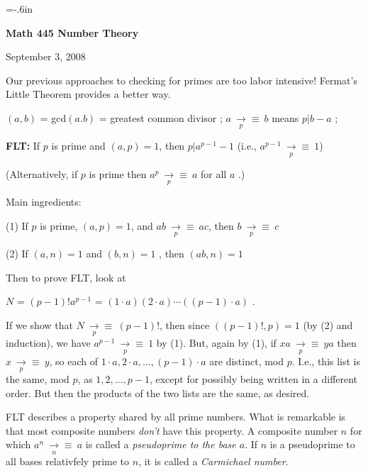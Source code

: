 

\loadmsbm

\nopagenumbers
\parindent=0pt
\voffset=-.6in


\def\ctln{\centerline}
\def\u{\underbar}
\def\zzz{{\Bbb Z}}
\def\modp{\medspace {\underset p\to \equiv} \medspace}
\def\modn{\medspace {\underset n\to \equiv} \medspace}

\ctln{\bf Math 445 Number Theory}

\medskip

\ctln{September 3, 2008}

\bigskip

Our previous approaches to checking for primes are too labor 
intensive! Fermat's Little Theorem provides a better way.

\medskip

$(a,b)$ = gcd$(a.b)$ = greatest common divisor ; $a\modp b$ means $p|b-a$ ; 

\medskip

{\bf FLT:} If $p$ is prime and $(a,p)=1$, then $p|a^{p-1}-1$  (i.e., $a^{p-1} \modp 1$)

\smallskip

(Alternatively, if $p$ is prime then $a^p\modp a$ for all $a$  .)

\medskip

Main ingredients:

\smallskip

(1) If $p$ is prime, $(a,p)=1$, and $ab\modp ac$, then $b\modp c$

\smallskip

(2) If  $(a,n) = 1$ and $(b,n) = 1$ , then $(ab,n)=1$

\medskip

Then to prove FLT, look at 

\ctln{$N$ = $(p-1)!a^{p-1}$ = $(1\cdot a)(2\cdot a)\cdots((p-1)\cdot a)$ .}
 
If we show that $N\modp (p-1)!$, then since $((p-1)!,p)=1$ (by (2) 
and induction), we have $a^{p-1}\modp 1$ 
by (1). But, again by (1), if $xa\modp ya$ then $x\modp y$, so each of
$1\cdot a, 2\cdot a, \ldots , (p-1)\cdot a$ are distinct, mod $p$. I.e., 
this list is the same, mod $p$, 
as $1,2,\ldots ,p-1$, except for possibly being written in a different order. 
But then the products of the two lists are the 
same, as desired.

\bigskip

FLT describes a property shared by all prime numbers. What is remarkable is that most
composite numbers {\it don't} have this property. A composite number $n$  for which
$a^n\modn a$ is called a {\it pseudoprime to the base $a$}. If $n$ is a pseudoprime to
all bases relativfely prime to $n$, it is called a {\it Carmichael number}.

